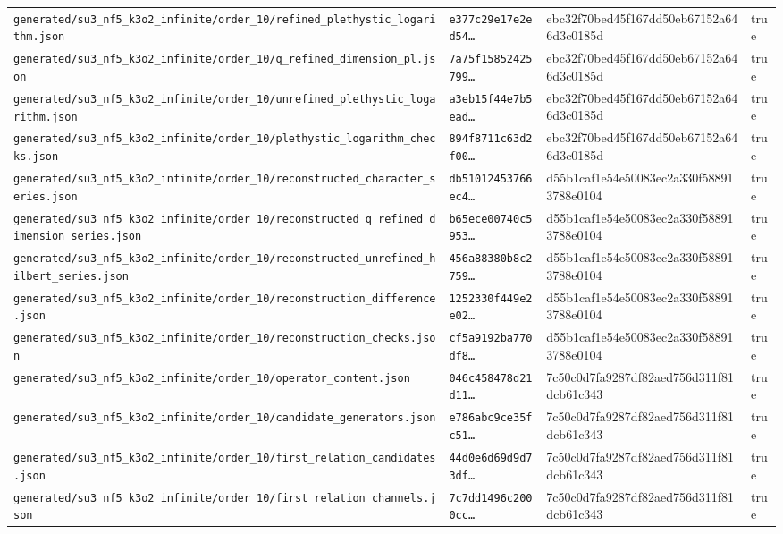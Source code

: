 \documentclass[11pt]{article}
\newcommand{\RawPath}[1]{\texttt{#1}}
\begin{document}
\begin{longtable}{p{5cm}p{3.2cm}p{3.2cm}l}
\RawPath{generated/su3\_nf5\_k3o2\_infinite/order\_10/refined\_plethystic\_logarithm.json} & \texttt{e377c29e17e2ed54\ldots} & ebc32f70bed45f167dd50eb67152a646d3c0185d & true\\
\RawPath{generated/su3\_nf5\_k3o2\_infinite/order\_10/q\_refined\_dimension\_pl.json} & \texttt{7a75f15852425799\ldots} & ebc32f70bed45f167dd50eb67152a646d3c0185d & true\\
\RawPath{generated/su3\_nf5\_k3o2\_infinite/order\_10/unrefined\_plethystic\_logarithm.json} & \texttt{a3eb15f44e7b5ead\ldots} & ebc32f70bed45f167dd50eb67152a646d3c0185d & true\\
\RawPath{generated/su3\_nf5\_k3o2\_infinite/order\_10/plethystic\_logarithm\_checks.json} & \texttt{894f8711c63d2f00\ldots} & ebc32f70bed45f167dd50eb67152a646d3c0185d & true\\
\RawPath{generated/su3\_nf5\_k3o2\_infinite/order\_10/reconstructed\_character\_series.json} & \texttt{db51012453766ec4\ldots} & d55b1caf1e54e50083ec2a330f588913788e0104 & true\\
\RawPath{generated/su3\_nf5\_k3o2\_infinite/order\_10/reconstructed\_q\_refined\_dimension\_series.json} & \texttt{b65ece00740c5953\ldots} & d55b1caf1e54e50083ec2a330f588913788e0104 & true\\
\RawPath{generated/su3\_nf5\_k3o2\_infinite/order\_10/reconstructed\_unrefined\_hilbert\_series.json} & \texttt{456a88380b8c2759\ldots} & d55b1caf1e54e50083ec2a330f588913788e0104 & true\\
\RawPath{generated/su3\_nf5\_k3o2\_infinite/order\_10/reconstruction\_difference.json} & \texttt{1252330f449e2e02\ldots} & d55b1caf1e54e50083ec2a330f588913788e0104 & true\\
\RawPath{generated/su3\_nf5\_k3o2\_infinite/order\_10/reconstruction\_checks.json} & \texttt{cf5a9192ba770df8\ldots} & d55b1caf1e54e50083ec2a330f588913788e0104 & true\\
\RawPath{generated/su3\_nf5\_k3o2\_infinite/order\_10/operator\_content.json} & \texttt{046c458478d21d11\ldots} & 7c50c0d7fa9287df82aed756d311f81dcb61c343 & true\\
\RawPath{generated/su3\_nf5\_k3o2\_infinite/order\_10/candidate\_generators.json} & \texttt{e786abc9ce35fc51\ldots} & 7c50c0d7fa9287df82aed756d311f81dcb61c343 & true\\
\RawPath{generated/su3\_nf5\_k3o2\_infinite/order\_10/first\_relation\_candidates.json} & \texttt{44d0e6d69d9d73df\ldots} & 7c50c0d7fa9287df82aed756d311f81dcb61c343 & true\\
\RawPath{generated/su3\_nf5\_k3o2\_infinite/order\_10/first\_relation\_channels.json} & \texttt{7c7dd1496c2000cc\ldots} & 7c50c0d7fa9287df82aed756d311f81dcb61c343 & true\\

\end{longtable}
\end{document}
